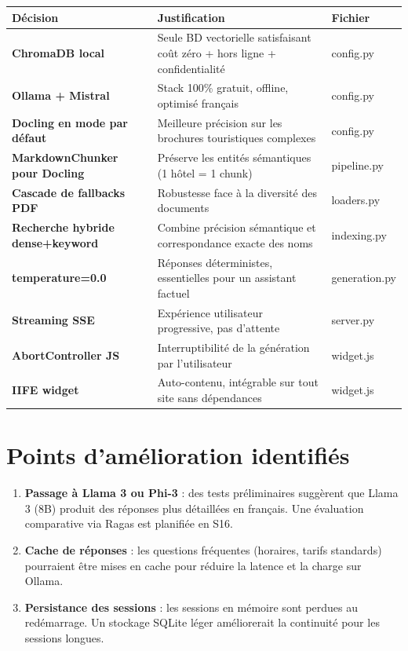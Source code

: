 \documentclass[12pt,a4paper]{report}
\begin{document}
\begin{center}
\renewcommand{\arraystretch}{1.5}
\begin{tabularx}{\linewidth}{>{\bfseries}p{3.5cm} X p{2.5cm}}
  \toprule
  \rowcolor{rowblue}
  \textbf{D\'{e}cision} & \textbf{Justification} & \textbf{Fichier} \\
  \midrule
  ChromaDB local & Seule BD vectorielle satisfaisant co\^{u}t z\'{e}ro + hors ligne + confidentialit\'{e} & config.py \\
  Ollama + Mistral & Stack 100\% gratuit, offline, optimis\'{e} fran\c{c}ais & config.py \\
  Docling en mode par d\'{e}faut & Meilleure pr\'{e}cision sur les brochures touristiques complexes & config.py \\
  MarkdownChunker pour Docling & Pr\'{e}serve les entit\'{e}s s\'{e}mantiques (1 h\^{o}tel = 1 chunk) & pipeline.py \\
  Cascade de fallbacks PDF & Robustesse face \`{a} la diversit\'{e} des documents & loaders.py \\
  Recherche hybride dense+keyword & Combine pr\'{e}cision s\'{e}mantique et correspondance exacte des noms & indexing.py \\
  temperature=0.0 & R\'{e}ponses d\'{e}terministes, essentielles pour un assistant factuel & generation.py \\
  Streaming SSE & Exp\'{e}rience utilisateur progressive, pas d'attente & server.py \\
  AbortController JS & Interruptibilit\'{e} de la g\'{e}n\'{e}ration par l'utilisateur & widget.js \\
  IIFE widget & Auto-contenu, int\'{e}grable sur tout site sans d\'{e}pendances & widget.js \\
  \bottomrule
\end{tabularx}
\end{center}

\section{Points d'am\'{e}lioration identifi\'{e}s}

\begin{enumerate}[leftmargin=*]
  \item \textbf{Passage \`{a} Llama 3 ou Phi-3} : des tests pr\'{e}liminaires sugg\`{e}rent
        que Llama 3 (8B) produit des r\'{e}ponses plus d\'{e}taill\'{e}es en fran\c{c}ais.
        Une \'{e}valuation comparative via Ragas est planifi\'{e}e en S16.
  \item \textbf{Cache de r\'{e}ponses} : les questions fr\'{e}quentes (horaires, tarifs standards)
        pourraient \^{e}tre mises en cache pour r\'{e}duire la latence et la charge sur Ollama.
  \item \textbf{Persistance des sessions} : les sessions en m\'{e}moire sont perdues au red\'{e}marrage.
        Un stockage SQLite l\'{e}ger am\'{e}liorerait la continuit\'{e} pour les sessions longues.
\end{enumerate}
\end{document}
